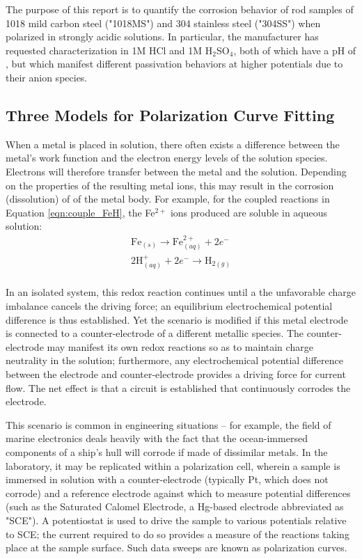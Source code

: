 The purpose of this report is to quantify the corrosion behavior of rod samples of 1018 mild carbon steel ("1018MS") and 304 stainless steel ("304SS") when polarized in strongly acidic solutions.  In particular, the manufacturer has requested characterization in 1M HCl and 1M H$_2$SO$_4$, both of which have a pH of , but which manifest different passivation behaviors at higher potentials due to their anion species.

\subsection{Three Models for Polarization Curve Fitting}

When a metal is placed in solution, there often exists a difference between the metal's work function and the electron energy levels of the solution species.  Electrons will therefore transfer between the metal and the solution. Depending on the properties of the resulting metal ions, this may result in the corrosion (dissolution) of of the metal body.  For example, for the coupled reactions in Equation \ref{eqn:couple_FeH}, the Fe$^{2+}$ ions produced are soluble in aqueous solution:
%
	\begin{equation}
	\begin{split}
		\text{Fe}_{(s)} \rightarrow \text{Fe}_{(aq)}^{2+} + 2 e^- \\
		2 \text{H}^+_{(aq)} + 2 e^- \rightarrow \text{H}_{2(g)} \\
	\end{split}
	\label{eqn:couple_FeH}
	\end{equation}
%

In an isolated system, this redox reaction continues until a the unfavorable charge imbalance cancels the driving force; an equilibrium electrochemical potential difference is thus established.  Yet the scenario is modified if this metal electrode is connected to a counter-electrode of a different metallic species.  The counter-electrode may manifest its own redox reactions so as to maintain charge neutrality in the solution; furthermore, any electrochemical potential difference between the electrode and counter-electrode provides a driving force for current flow.  The net effect is that a circuit is established that continuously corrodes the electrode.

This scenario is common in engineering situations -- for example, the field of marine electronics deals heavily with the fact that the ocean-immersed components of a ship's hull will corrode if made of dissimilar metals.  In the laboratory, it may be replicated within a polarization cell, wherein a sample is immersed in solution with a counter-electrode (typically Pt, which does not corrode) and a reference electrode against which to measure potential differences (such as the Saturated Calomel Electrode, a Hg-based electrode abbreviated as "SCE").  A potentiostat is used to drive the sample to various potentials relative to SCE; the current required to do so provides a measure of the reactions taking place at the sample surface.  Such data sweeps are known as polarization curves.

